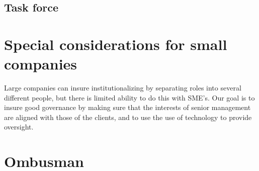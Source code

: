 \subsection{Task force}

\section{Special considerations for small companies}

Large companies can insure institutionalizing by separating roles into
several different people, but there is limited ability to do this with
SME's.  Our goal is to insure good governance by making sure that the
interests of senior management are aligned with those of the clients,
and to use the use of technology to provide oversight.

\section{Ombusman}


